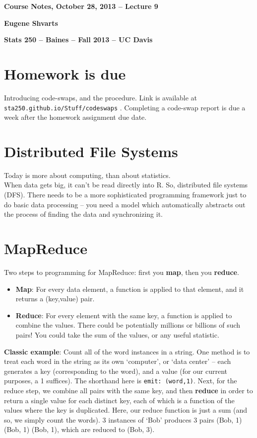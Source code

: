 \documentclass[12pt,letterpaper]{article}
\begin{document}
\hfill\textbf{\large Course Notes, October 28, 2013 -- Lecture 9}

\hfill\textbf{Eugene Shvarts}

\hfill\textbf{Stats 250 -- Baines -- Fall 2013 -- UC Davis}
\medskip

\section*{Homework is due}

Introducing code-swaps, and the procedure. Link is available at \texttt{sta250.github.io/Stuff/codeswaps} . Completing a code-swap report is due a week after the homework assignment due date. 

\section*{Distributed File Systems}

Today is more about computing, than about statistics. \\

\noindent When data gets big, it can't be read directly into R. So, distributed file systems (DFS). There needs to be a more sophisticated programming framework just to do basic data processing -- you need a model which automatically abstracts out the process of finding the data and synchronizing it. 

\section*{MapReduce}

Two steps to programming for MapReduce: first you \textbf{map}, then you \textbf{reduce}.
\begin{itemize}
\item \textbf{Map}: For every data element, a function is applied to that element, and it returns a (key,value) pair. 

\item \textbf{Reduce}: For every element with the same key, a function is applied to combine the values. There could be potentially millions or billions of such pairs! You could take the sum of the values, or any useful statistic.
\end{itemize}

\textbf{Classic example}: Count all of the word instances in a string. One method is to treat each word in the string as its own `computer', or `data center' -- each generates a key (corresponding to the word), and a value (for our current purposes, a 1 suffices). The shorthand here is \texttt{emit: (word,1)}. Next, for the reduce step, we combine all pairs with the same key, and then \textbf{reduce} in order to return a single value for each distinct key, each of which is a function of the values where the key is duplicated. Here, our reduce function is just a sum (and so, we simply count the words). 3 instances of `Bob' produces 3 pairs (Bob, 1) (Bob, 1) (Bob, 1), which are reduced to (Bob, 3). \\
\end{document}

